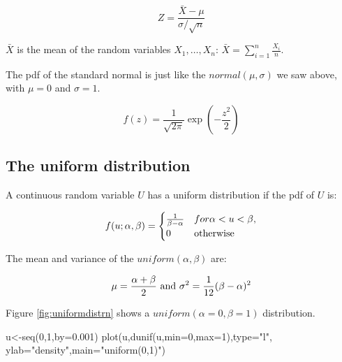 \documentclass[
  12pt,
]{krantz}
\newenvironment{Shaded}{\begin{snugshade}}{\end{snugshade}}
\newcommand{\AttributeTok}[1]{\textcolor[rgb]{0.77,0.63,0.00}{#1}}
\newcommand{\DecValTok}[1]{\textcolor[rgb]{0.00,0.00,0.81}{#1}}
\newcommand{\FloatTok}[1]{\textcolor[rgb]{0.00,0.00,0.81}{#1}}
\newcommand{\FunctionTok}[1]{\textcolor[rgb]{0.00,0.00,0.00}{#1}}
\newcommand{\NormalTok}[1]{#1}
\newcommand{\OtherTok}[1]{\textcolor[rgb]{0.56,0.35,0.01}{#1}}
\newcommand{\StringTok}[1]{\textcolor[rgb]{0.31,0.60,0.02}{#1}}
\theoremstyle{definition}
\theoremstyle{definition}
\theoremstyle{definition}
\theoremstyle{definition}
\theoremstyle{remark}
\begin{document}
\begin{equation}
Z = \frac{\bar{X} - \mu}{\sigma/\sqrt{n}}
\end{equation}

\(\bar{X}\) is the mean of the random variables \(X_1,\dots, X_n\): \(\bar{X}=\sum_{i=1}^n \frac{X_i}{n}\).

The pdf of the standard normal is just like the \(\mathit{normal}(\mu,\sigma)\) we saw above, with \(\mu = 0\) and \(\sigma = 1\).

\begin{equation}
f(z)= \frac{1}{\sqrt{2\pi}} \exp \left(-\frac{z^2}{2} \right)
\end{equation}

\hypertarget{the-uniform-distribution}{%
\subsection{The uniform distribution}\label{the-uniform-distribution}}

A continuous random variable \(U\) has a uniform distribution if the pdf of \(U\) is:

\begin{equation}
f(u; \alpha, \beta)=
\begin{cases}
\frac{1}{\beta-\alpha} &  for \alpha < u < \beta ,\\
0 & \hbox{otherwise}
\end{cases}
\end{equation}

The mean and variance of the \(\mathit{uniform}(\alpha,\beta)\) are:

\begin{equation}
\mu = \frac{\alpha + \beta}{2} \hbox{  and  }  
\sigma^2 = \frac{1}{12} (\beta-\alpha)^2
\end{equation}

Figure \ref{fig:uniformdistrn} shows a \(\mathit{uniform}(\alpha=0,\beta=1)\) distribution.

\begin{Shaded}
\begin{Highlighting}[]
\NormalTok{u}\OtherTok{\textless{}{-}}\FunctionTok{seq}\NormalTok{(}\DecValTok{0}\NormalTok{,}\DecValTok{1}\NormalTok{,}\AttributeTok{by=}\FloatTok{0.001}\NormalTok{)}
\FunctionTok{plot}\NormalTok{(u,}\FunctionTok{dunif}\NormalTok{(u,}\AttributeTok{min=}\DecValTok{0}\NormalTok{,}\AttributeTok{max=}\DecValTok{1}\NormalTok{),}\AttributeTok{type=}\StringTok{"l"}\NormalTok{,}
     \AttributeTok{ylab=}\StringTok{"density"}\NormalTok{,}\AttributeTok{main=}\StringTok{"uniform(0,1)"}\NormalTok{)}
\end{Highlighting}
\end{Shaded}
\end{document}
